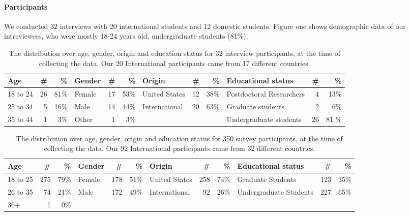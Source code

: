 \paragraph{Participants}
We conducted 32 interviews with 20
international students and 12 domestic students. Figure one shows demographic data of our intreviewees, who were mostly 18-24 years old, undergraduate students (81\%).

\begin{table*}[h!]
\centering
\begin{tabular}{l r r |l r r|l r r|l r r} 
 \hline
 Age & \# & \% & Gender & \# & \% & Origin & \# & \% & Educational status & \# & \% \\
\hline
18 to 24 & 26 & 81\% & Female & 17 & 53\% & United States & 12 & 38\% & Postdoctoral Researchers & 4 & 13\% \\
25 to 34 & 5 & 16\% & Male & 14 & 44\% & International & 20 & 63\% & Graduate students & 2 & 6\% \\
35 to 44 & 1 & 3\% & Other & 1 & 3\% & & & & Undergraduate students & 26 & 81 \% \\
 \hline
\end{tabular}
\caption{The distribution over age, gender, origin and education status for 32 interview participants, at the time of collecting the data. Our 20 International participants came from 17 different countries.}
\label{table:1}
\end{table*}

\begin{table*}[h!]
\centering
\begin{tabular}{l r r |l r r|l r r|l r r} 
 \hline
 Age & \# & \% & Gender & \# & \% & Origin & \# & \% & Educational status & \# & \% \\
\hline
18 to 25 & 275 & 79\% & Female & 178 & 51\% & United States & 258 & 74\% & Graduate Students & 123 & 35\% \\
26 to 35 & 74 & 21\% & Male & 172 & 49\% & International & 92 & 26\% & Undergraduate Students & 227 & 65\% \\
36+ & 1 & 0\% & & & & & & & & & \\
 \hline
\end{tabular}
\caption{The distribution over age, gender, origin and education status for 350 survey participants, at the time of collecting the data. Our 92 International participants came from 32 different countries.}
\label{table:2}
\end{table*}

